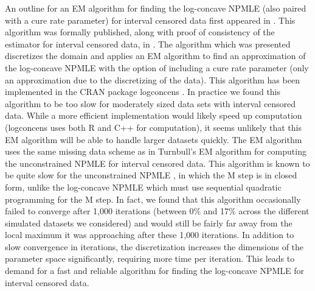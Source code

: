 	An outline for an EM algorithm for finding the log-concave NPMLE (also paired with a cure rate parameter) for interval censored data first appeared in \cite{RefDea2007}. This algorithm was formally published, along with proof of consistency of the estimator for interval censored data, in \cite{RefDea2014}. The algorithm which was presented discretizes the domain and applies an EM algorithm to find an approximation of the log-concave NPMLE with the option of including a cure rate parameter (only an approximation due to the discretizing of the data). This algorithm has been implemented in the CRAN package logconcens \cite{R_logconcens}. In practice we found this algorithm to be too slow for moderately sized data sets with interval censored data. While a more efficient implementation would likely speed up computation (logconcens uses both R and C++ for computation), it seems unlikely that this EM algorithm will be able to handle larger datasets quickly. The EM algorithm uses the same missing data scheme as in Turnbull's EM algorithm \cite{RefT1976} for computing the unconstrained NPMLE for interval censored data. This algorithm is known to be quite slow for the unconstrained NPMLE \cite{RefJ1998}, in which the M step is in closed form, unlike the log-concave NPMLE which must use sequential quadratic programming for the M step. In fact, we found that this algorithm occasionally failed to converge after 1,000 iterations (between 0\% and 17\% across the different simulated datasets we considered) and would still be fairly far away from the local maximum it was approaching after these 1,000 iterations. In addition to slow convergence in iterations, the discretization increases the dimensions of the parameter space significantly, requiring more time per iteration. This leads to demand for a fast and reliable algorithm for finding the log-concave NPMLE for interval censored data. 
	
	
		
